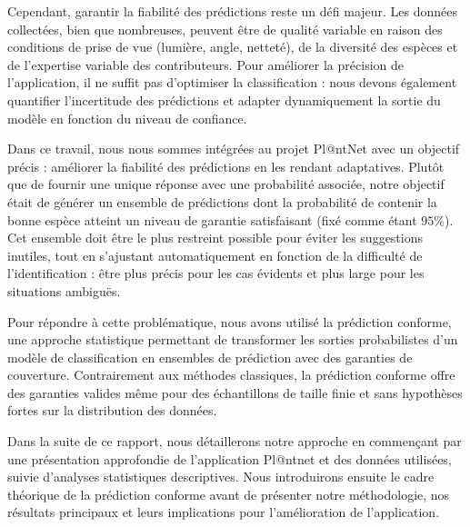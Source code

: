 \documentclass[a4paper,12pt]{article}
\begin{document}
\vspace{0.2cm}

Cependant, garantir la fiabilité des prédictions reste un défi majeur. Les données collectées, bien que nombreuses, peuvent être de qualité variable en raison des conditions de prise de vue (lumière, angle, netteté), de la diversité des espèces et de l'expertise variable des contributeurs. Pour améliorer la précision de l'application, il ne suffit pas d’optimiser la classification : nous devons également quantifier l’incertitude des prédictions et adapter dynamiquement la sortie du modèle en fonction du niveau de confiance.

\vspace{0.2cm}

Dans ce travail, nous nous sommes intégrées au projet Pl@ntNet avec un objectif précis : améliorer la fiabilité des prédictions en les rendant adaptatives. Plutôt que de fournir une unique réponse avec une probabilité associée, notre objectif était de générer un ensemble de prédictions dont la probabilité de contenir la bonne espèce atteint un niveau de garantie satisfaisant (fixé comme étant $95\%$). Cet ensemble doit être le plus restreint possible pour éviter les suggestions inutiles, tout en s'ajustant automatiquement en fonction de la difficulté de l’identification : être plus précis pour les cas évidents et plus large pour les situations ambiguës.

\vspace{0.2cm}

Pour répondre à cette problématique, nous avons utilisé la prédiction conforme, une approche statistique permettant de transformer les sorties probabilistes d'un modèle de classification en ensembles de prédiction avec des garanties de couverture. Contrairement aux méthodes classiques, la prédiction conforme offre des garanties valides même pour des échantillons de taille finie et sans hypothèses fortes sur la distribution des données.

\vspace{0.2cm}

Dans la suite de ce rapport, nous détaillerons notre approche en commençant par une présentation approfondie de l'application Pl@ntnet et des données utilisées, suivie d'analyses statistiques descriptives. Nous introduirons ensuite le cadre théorique de la prédiction conforme avant de présenter notre méthodologie, nos résultats principaux et leurs implications pour l'amélioration de l'application.

\end{document}

